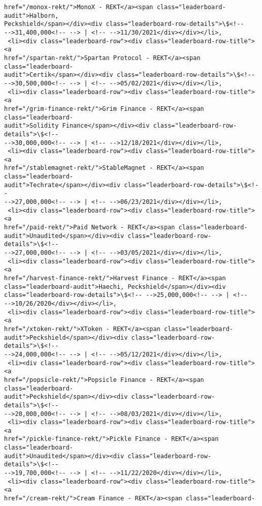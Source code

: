 \documentclass[11pt]{article}
\begin{document}
\begin{tcolorbox}[breakable, size=fbox, boxrule=.5pt, pad at break*=1mm, opacityfill=0]
\begin{Verbatim}[commandchars=\\\{\}]
href="/monox-rekt/">MonoX - REKT</a><span class="leaderboard-audit">Halborn,
Peckshield</span></div><div class="leaderboard-row-details">\$<!--
-->31,400,000<!-- --> | <!-- -->11/30/2021</div></div></li>,
 <li><div class="leaderboard-row"><div class="leaderboard-row-title"><a
href="/spartan-rekt/">Spartan Protocol - REKT</a><span class="leaderboard-
audit">Certik</span></div><div class="leaderboard-row-details">\$<!--
-->30,500,000<!-- --> | <!-- -->05/02/2021</div></div></li>,
 <li><div class="leaderboard-row"><div class="leaderboard-row-title"><a
href="/grim-finance-rekt/">Grim Finance - REKT</a><span class="leaderboard-
audit">Solidity Finance</span></div><div class="leaderboard-row-details">\$<!--
-->30,000,000<!-- --> | <!-- -->12/18/2021</div></div></li>,
 <li><div class="leaderboard-row"><div class="leaderboard-row-title"><a
href="/stablemagnet-rekt/">StableMagnet - REKT</a><span class="leaderboard-
audit">Techrate</span></div><div class="leaderboard-row-details">\$<!--
-->27,000,000<!-- --> | <!-- -->06/23/2021</div></div></li>,
 <li><div class="leaderboard-row"><div class="leaderboard-row-title"><a
href="/paid-rekt/">Paid Network - REKT</a><span class="leaderboard-
audit">Unaudited</span></div><div class="leaderboard-row-details">\$<!--
-->27,000,000<!-- --> | <!-- -->03/05/2021</div></div></li>,
 <li><div class="leaderboard-row"><div class="leaderboard-row-title"><a
href="/harvest-finance-rekt/">Harvest Finance - REKT</a><span
class="leaderboard-audit">Haechi, Peckshield</span></div><div
class="leaderboard-row-details">\$<!-- -->25,000,000<!-- --> | <!--
-->10/26/2020</div></div></li>,
 <li><div class="leaderboard-row"><div class="leaderboard-row-title"><a
href="/xtoken-rekt/">XToken - REKT</a><span class="leaderboard-
audit">Peckshield</span></div><div class="leaderboard-row-details">\$<!--
-->24,000,000<!-- --> | <!-- -->05/12/2021</div></div></li>,
 <li><div class="leaderboard-row"><div class="leaderboard-row-title"><a
href="/popsicle-rekt/">Popsicle Finance - REKT</a><span class="leaderboard-
audit">Peckshield</span></div><div class="leaderboard-row-details">\$<!--
-->20,000,000<!-- --> | <!-- -->08/03/2021</div></div></li>,
 <li><div class="leaderboard-row"><div class="leaderboard-row-title"><a
href="/pickle-finance-rekt/">Pickle Finance - REKT</a><span class="leaderboard-
audit">Unaudited</span></div><div class="leaderboard-row-details">\$<!--
-->19,700,000<!-- --> | <!-- -->11/22/2020</div></div></li>,
 <li><div class="leaderboard-row"><div class="leaderboard-row-title"><a
href="/cream-rekt/">Cream Finance - REKT</a><span class="leaderboard-

\end{Verbatim}
\end{tcolorbox}
\end{document}
